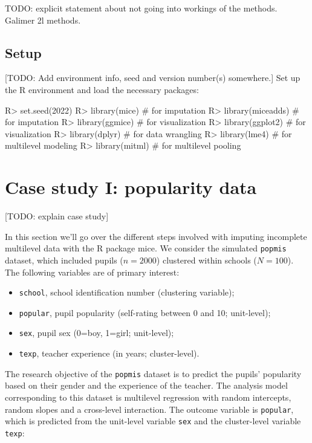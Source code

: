 \documentclass[
]{jss}
\providecommand{\tightlist}{%
  \setlength{\itemsep}{0pt}\setlength{\parskip}{0pt}}
\begin{document}
TODO: explicit statement about not going into workings of the methods.
Galimer 2l methods.

\hypertarget{setup}{%
\subsection{Setup}\label{setup}}

{[}TODO: Add environment info, seed and version number(s) somewhere.{]}
Set up the R environment and load the necessary packages:

\begin{CodeChunk}
\begin{CodeInput}
R> set.seed(2022)
R> library(mice)         # for imputation
R> library(miceadds)     # for imputation
R> library(ggmice)       # for visualization
R> library(ggplot2)      # for visualization
R> library(dplyr)        # for data wrangling
R> library(lme4)         # for multilevel modeling
R> library(mitml)        # for multilevel pooling
\end{CodeInput}
\end{CodeChunk}

\hypertarget{case-study-i-popularity-data}{%
\section{Case study I: popularity
data}\label{case-study-i-popularity-data}}

{[}TODO: explain case study{]}

In this section we'll go over the different steps involved with imputing
incomplete multilevel data with the R package mice. We consider the
simulated \texttt{popmis} dataset, which included pupils (\(n = 2000\))
clustered within schools (\(N = 100\)). The following variables are of
primary interest:

\begin{itemize}
\tightlist
\item
  \texttt{school}, school identification number (clustering variable);
\item
  \texttt{popular}, pupil popularity (self-rating between 0 and 10;
  unit-level);
\item
  \texttt{sex}, pupil sex (0=boy, 1=girl; unit-level);
\item
  \texttt{texp}, teacher experience (in years; cluster-level).
\end{itemize}

The research objective of the \texttt{popmis} dataset is to predict the
pupils' popularity based on their gender and the experience of the
teacher. The analysis model corresponding to this dataset is multilevel
regression with random intercepts, random slopes and a cross-level
interaction. The outcome variable is \texttt{popular}, which is
predicted from the unit-level variable \texttt{sex} and the
cluster-level variable \texttt{texp}:
\end{document}
